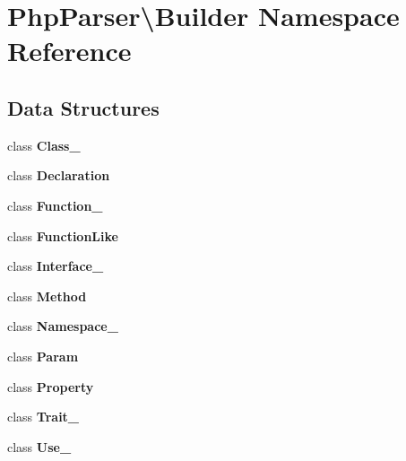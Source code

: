 \section{Php\+Parser\textbackslash{}Builder Namespace Reference}
\label{namespace_php_parser_1_1_builder}
\subsection*{Data Structures}
\begin{DoxyCompactItemize}
\item 
class {\bf Class\+\_\+}
\item 
class {\bf Declaration}
\item 
class {\bf Function\+\_\+}
\item 
class {\bf Function\+Like}
\item 
class {\bf Interface\+\_\+}
\item 
class {\bf Method}
\item 
class {\bf Namespace\+\_\+}
\item 
class {\bf Param}
\item 
class {\bf Property}
\item 
class {\bf Trait\+\_\+}
\item 
class {\bf Use\+\_\+}
\end{DoxyCompactItemize}
